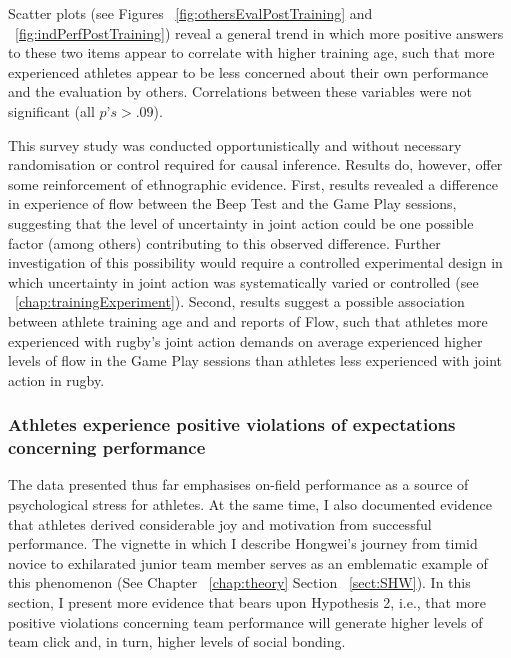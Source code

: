 \begin{CJK}{UTF8}{gbsn}
Scatter plots (see Figures ~\ref{fig:othersEvalPostTraining} and ~\ref{fig:indPerfPostTraining}) reveal a general trend in which more positive answers to these two items appear to correlate with higher training age, such that more experienced athletes appear to be less concerned about their own performance and the evaluation by others.  Correlations between these variables were not significant (all $p’s > .09$).

This survey study was conducted opportunistically and without necessary randomisation or control required for causal inference.  Results do, however, offer some reinforcement of ethnographic evidence. First, results revealed a difference in experience of flow between the Beep Test and the Game Play sessions, suggesting that the level of uncertainty in joint action could be one possible factor (among others) contributing to this observed difference. Further investigation of this possibility would require a controlled experimental design in which uncertainty in joint action was systematically varied or controlled (see ~\ref{chap:trainingExperiment}).  Second, results suggest a possible association between athlete training age and and reports of Flow, such that athletes more experienced with rugby’s joint action demands on average experienced higher levels of flow  in the Game Play sessions than athletes less experienced with joint action in rugby.








\subsubsection{Athletes experience positive violations of expectations concerning performance\label{sect:expectationViolation}}
The data presented thus far emphasises on-field performance as a source of psychological stress for athletes. At the same time, I also documented evidence that athletes derived considerable joy and motivation from successful performance.  The vignette in which I describe Hongwei's journey from timid novice to exhilarated junior team member serves as an emblematic example of this phenomenon (See Chapter ~\ref{chap:theory} Section ~\ref{sect:SHW}).  In this section, I present more evidence that bears upon Hypothesis 2, i.e., that more positive violations concerning team performance will generate higher levels of team click and, in turn, higher levels of social bonding.


\end{CJK}

